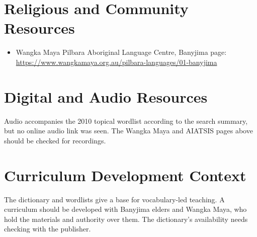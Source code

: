 \documentclass[12pt]{article}
\begin{document}
\section{Religious and Community Resources}
\begin{itemize}
\item Wangka Maya Pilbara Aboriginal Language Centre, Banyjima page: \url{https://www.wangkamaya.org.au/pilbara-languages/01-banyjima}
\end{itemize}

\section{Digital and Audio Resources}
Audio accompanies the 2010 topical wordlist according to the search summary, but no online audio link was seen. The Wangka Maya and AIATSIS pages above should be checked for recordings.

\section{Curriculum Development Context}
The dictionary and wordlists give a base for vocabulary-led teaching. A curriculum should be developed with Banyjima elders and Wangka Maya, who hold the materials and authority over them. The dictionary's availability needs checking with the publisher.
\end{document}

